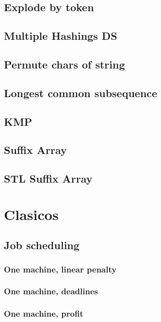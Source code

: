 \subsection{Explode by token}
\subsection{Multiple Hashings DS}
\subsection{Permute chars of string}
\subsection{Longest common subsequence}
\subsection{KMP}
\subsection{Suffix Array}
\subsection{STL Suffix Array}
\section{Clasicos}
\subsection{Job scheduling}
\subsubsection{One machine, linear penalty}
\subsubsection{One machine, deadlines}
\subsubsection{One machine, profit}
